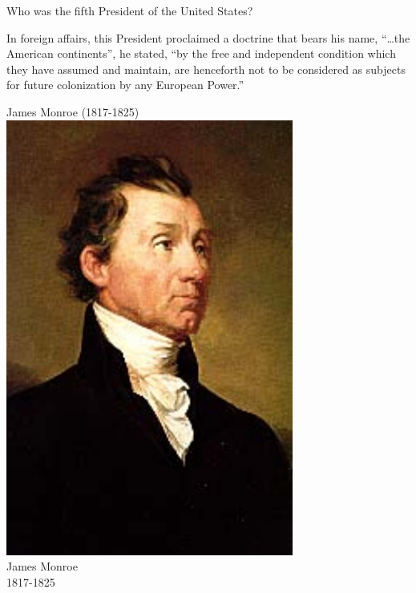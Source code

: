 \documentclass{article}
\def\rescale{.4} %
\begin{document}
\begin{card}
    Who was the fifth President of the United States?
\begin{response}
    \begin{hint}
        In foreign affairs, this President proclaimed a doctrine that
        bears his name, ``\dots the American continents'', he stated, ``by the
        free and independent condition which they have assumed and
        maintain, are henceforth not to be considered as subjects for
        future colonization by any European Power.''
    \end{hint}
    \begin{answer}
    \ifecListing
        James Monroe (1817-1825)
    \else\centering
            \includegraphics[scale=\rescale]{presidents/jm5}\\
            James Monroe\\
            1817-1825
    \fi
    \end{answer}
\end{response}
\end{card}
\end{document}
